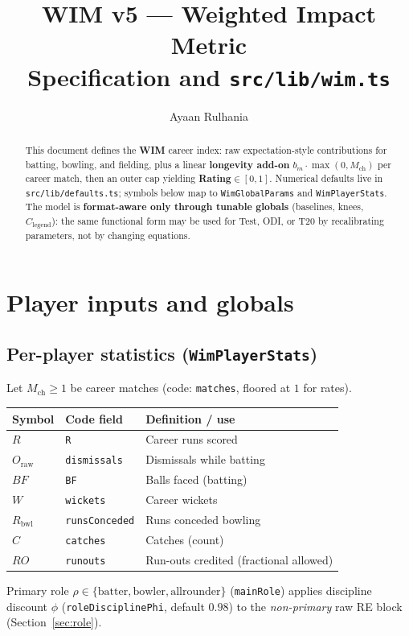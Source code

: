 \documentclass[12pt,a4paper]{article}
\title{WIM v5 --- Weighted Impact Metric\\{\large Specification and \texttt{src/lib/wim.ts}}}
\author{Ayaan Rulhania}
\date{}
\begin{document}
\maketitle

\begin{abstract}
This document defines the \textbf{WIM} career index: raw expectation-style contributions for batting, bowling, and fielding, plus a linear \textbf{longevity add-on} $b_m\cdot\max(0,M_{\mathrm{ch}})$ per career match, then an outer cap yielding \textbf{Rating}$\in[0,1]$.
Numerical defaults live in \texttt{src/lib/defaults.ts}; symbols below map to \texttt{WimGlobalParams} and \texttt{WimPlayerStats}.
The model is \textbf{format-aware only through tunable globals} (baselines, knees, $C_{\mathrm{legend}}$): the same functional form may be used for Test, ODI, or T20 by recalibrating parameters, not by changing equations.
\end{abstract}

\section{Player inputs and globals}

\subsection{Per-player statistics (\texttt{WimPlayerStats})}
Let $M_{\mathrm{ch}}\ge 1$ be career matches (code: \texttt{matches}, floored at $1$ for rates).
\begin{center}
\begin{tabular}{l|l|l}
\hline
Symbol & Code field & Definition / use \\
\hline
$R$ & \texttt{R} & Career runs scored \\
$O_{\mathrm{raw}}$ & \texttt{dismissals} & Dismissals while batting \\
$BF$ & \texttt{BF} & Balls faced (batting) \\
$W$ & \texttt{wickets} & Career wickets \\
$R_{\mathrm{bwl}}$ & \texttt{runsConceded} & Runs conceded bowling \\
$C$ & \texttt{catches} & Catches (count) \\
$RO$ & \texttt{runouts} & Run-outs credited (fractional allowed) \\
\hline
\end{tabular}
\end{center}
Primary role $\rho\in\{\mathrm{batter},\mathrm{bowler},\mathrm{allrounder}\}$ (\texttt{mainRole}) applies discipline discount $\phi$ (\texttt{roleDisciplinePhi}, default $0.98$) to the \emph{non-primary} raw RE block (Section~\ref{sec:role}).
\end{document}
